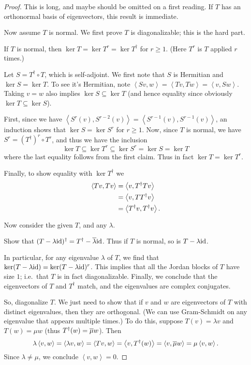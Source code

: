 \begin{proof}
	This is long, and maybe should be omitted on a first reading.
	If $T$ has an orthonormal basis of eigenvectors,
	this result is immediate.

	Now assume $T$ is normal.
	We first prove $T$ is diagonalizable; this is the hard part.
	\begin{claim}
		If $T$ is normal, then $\ker T = \ker T^r = \ker T^\dagger$ for $r \ge 1$.
		(Here $T^r$ is $T$ applied $r$ times.)
	\end{claim}
	\begin{subproof}
		Let $S = T^\dagger \circ T$, which is self-adjoint.
		We first note that $S$ is Hermitian and $\ker S = \ker T$.
		To see it's Hermitian, note
		$\left<Sv, w \right> = \left<Tv, Tw \right> = \left<v, S w \right>$.
		Taking $v = w$ also implies $\ker S \subseteq \ker T$
		(and hence equality since obviously $\ker T \subseteq \ker S$).

		First, since we have $\left< S^r(v), S^{r-2}(v) \right>
		= \left< S^{r-1}(v), S^{r-1}(v)\right>$,
		an induction shows that $\ker S = \ker S^r$ for $r \ge 1$.
		Now, since $T$ is normal, we have $S^r = (T^\dagger)^r \circ T^r$,
		and thus we have the inclusion
		\[ \ker T \subseteq \ker T^r \subseteq \ker S^r = \ker S = \ker T \]
		where the last equality follows from the first claim.
		Thus in fact $\ker T = \ker T^r$.

		Finally, to show equality with $\ker T^\dagger$ we 
		\begin{align*}
			\left< Tv, Tv\right> &= \left< v, T^\dagger T v\right> \\
			&= \left< v, T T^\dagger v \right> \\
			&= \left< T^\dagger v, T^\dagger v \right>. \qedhere
		\end{align*}
	\end{subproof}

	Now consider the given $T$, and any $\lambda$.
	\begin{ques}
		Show that $(T - \lambda\mathrm{id})^\dagger = T^\dagger - \overline\lambda \mathrm{id}$.
		Thus if $T$ is normal, so is $T - \lambda \mathrm{id}$.
	\end{ques}
	In particular, for any eigenvalue $\lambda$ of $T$,
	we find that $\ker (T-\lambda\mathrm{id}) = \ker(T-\lambda\mathrm{id})^r$.
	This implies that all the Jordan blocks of $T$ have size $1$;
	i.e.\ that $T$ is in fact diagonalizable.
	Finally, we conclude that the eigenvectors of $T$ and $T^\dagger$ match,
	and the eigenvalues are complex conjugates.

	So, diagonalize $T$.
	We just need to show that if $v$ and $w$ are eigenvectors of $T$
	with distinct eigenvalues, then they are orthogonal.
	(We can use Gram-Schmidt on any eigenvalue that appears multiple times.)
	To do this, suppose $T(v) = \lambda v$ and $T(w) = \mu w$
	(thus $T^\dagger(w) = \overline\mu w $).
	Then
	\[ \lambda \left< v,w\right>
		= \left< \lambda v, w\right>
		= \left< Tv, w\right>
		= \left< v, T^\dagger(w)\right>
		= \left< v, \overline \mu w \right> 
		= \mu \left< v, w\right>. \]		
	Since $\lambda \neq \mu$, we conclude $\left< v,w \right> = 0$.
\end{proof}
